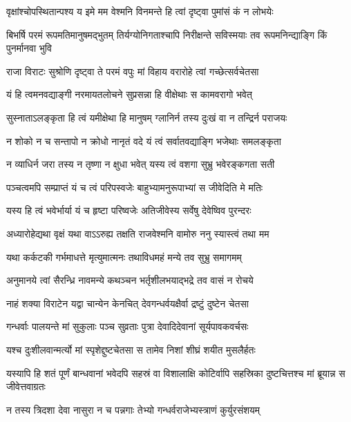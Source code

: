 \twolineshloka
{वृक्षांश्चोपस्थितान्पश्य य इमे मम वेश्मनि}
{विनमन्ते हि त्वां दृष्ट्वा पुमांसं कं न लोभयेः}


\threelineshloka
{बिभर्षि परमं रूपमतिमानुषमद्भुतम्}
{तिर्यग्योनिगताश्चापि निरीक्षन्ते सविस्मयाः}
{तव रूपमनिन्द्याङ्गि किं पुनर्मानवा भुवि}


\twolineshloka
{राजा विराटः सुश्रोणि दृष्ट्वा ते परमं वपुः}
{मां विहाय वरारोहे त्वां गच्छेत्सर्वचेतसा}


\twolineshloka
{यं हि त्वमनवद्याङ्गी नरमायतलोचने}
{सुप्रसन्ना हि वीक्षेथाः स कामवरागो भवेत्}


\twolineshloka
{सुस्नाताऽलङ्कृता हि त्वं यमीक्षेथा हि मानुषम्}
{ग्लानिर्न तस्य दुःखं वा न तन्द्रिर्न पराजयः}


\twolineshloka
{न शोको न च सन्तापो न क्रोधो नानृतं वदे}
{यं त्वं सर्वातवद्याङ्गि भजेथाः समलङ्कृता}


\twolineshloka
{न व्याधिर्न जरा तस्य न तृष्णा न क्षुधा भवेत्}
{यस्य त्वं वशगा सुभ्रु भवेरङ्कगता सती}





\twolineshloka
{पञ्चत्वमपि सम्प्राप्तं यं च त्वं परिपस्वजेः}
{बाहुभ्यामनुरूपाभ्यां स जीवेदिति मे मतिः}


\twolineshloka
{यस्य हि त्वं भवेर्भार्या यं च हृष्टा परिष्वजेः}
{अतिजीवेस्य सर्वेषु देवेष्विव पुरन्दरः}


\twolineshloka
{अध्यारोहेद्यथा वृक्षं यथा वाऽऽरुह्य तक्षति}
{राजवेश्मनि वामोरु ननु स्यास्त्वं तथा मम}


\twolineshloka
{यथा कर्कटकी गर्भमाधत्ते मृत्युमात्मनः}
{तथाविधमहं मन्ये तव सुभ्रु समागमम्}


\twolineshloka
{अनुमानये त्वां सैरन्ध्रि नावमन्ये कथञ्चन}
{भर्तृशीलभयाद्भद्रे तव वासं न रोचये}




\twolineshloka
{नाहं शक्या विराटेन यद्वा चान्येन केनचित्}
{देवगन्धर्वयक्षैर्वा द्रष्टुं दुष्टेन चेतसा}


\twolineshloka
{गन्धर्वाः पालयन्ते मां सुकुलाः पञ्च सुव्रताः}
{पुत्रा देवादिदेवानां सूर्यपावकवर्चसः}


\twolineshloka
{यश्च दुःशीलवान्मर्त्यो मां स्पृशेद्दुष्टचेतसा}
{स तामेव निशां शीघ्रं शयीत मुसलैर्हतः}


\threelineshloka
{यस्यापि हि शतं पूर्णं बान्धवानां भवेदपि}
{सहस्रं वा विशालाक्षि कोटिर्वापि सहस्रिका}
{दुष्टचित्तश्च मां ब्रूयान्न स जीवेत्तवाग्रतः}


\twolineshloka
{न तस्य त्रिदशा देवा नासुरा न च पन्नगाः}
{तेभ्यो गन्धर्वराजेभ्यस्त्राणं कुर्युरसंशयम्}


